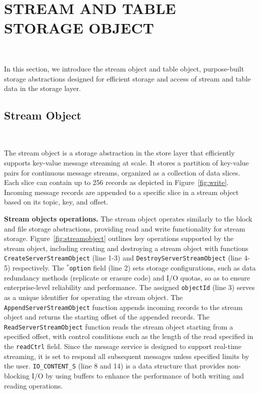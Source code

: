 \section{STREAM AND TABLE STORAGE OBJECT} 
~\label{sec:datagen}

In this section, we introduce the stream object and table object, purpose-built storage abstractions designed for efficient storage and access of stream and table data in the storage layer.


\subsection{Stream Object}~\label{subsec:streamobject}

The stream object is a storage abstraction in the store layer that efficiently supports key-value message streaming at scale. It stores a partition of key-value pairs for continuous message streams, organized as a collection of data slices. Each slice can contain up to 256 records as depicted in Figure~\ref{fig:write}. Incoming message records are appended  to a specific slice in a stream object based on its topic, key, and offset.

\noindent \textbf{Stream objects operations.} The stream object operates similarly to the block and file storage abstractions, providing read and write functionality for stream storage. Figure~\ref{fig:streamobject} outlines key operations supported by the stream object, including creating and destroying a stream object with  functions \texttt{CreateServerStreamObject} (line 1-3) and \texttt{DestroyServerStreamObject} (line 4-5) respectively. The \texttt{$^*$option} field (line 2) sets storage configurations, such as data redundancy methods (replicate or erasure code) and I/O quotas, so as to ensure enterprise-level reliability and performance. The assigned \texttt{objectId} (line 3) serves as a unique identifier for operating the stream object. The \texttt{AppendServerStreamObject} function appends incoming records  to the stream object and returns the starting offset of the appended records. The \texttt{ReadServerStreamObject} function reads the stream object starting from a specified offset, with control conditions such as the length of the read specified in the \texttt{readCtrl} field. 
Since the message service is designed to support real-time streaming, it is set to respond  all subsequent messages unless specified  limits by the user.
\texttt{IO\_CONTENT\_S} (line 8 and 14) is a data structure that provides non-blocking I/O by using buffers to enhance the performance of both writing and reading operations.


